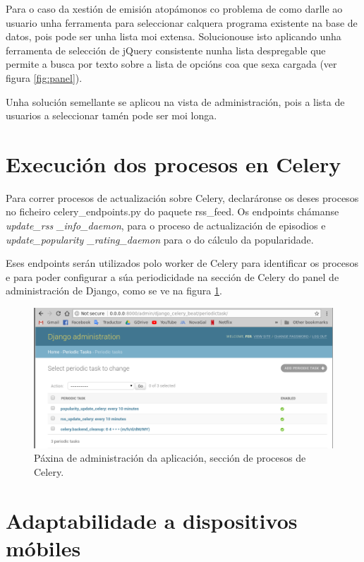 Para o caso da xestión de emisión atopámonos co problema de como darlle ao usuario unha ferramenta para seleccionar calquera programa existente na base de datos, pois pode ser unha lista moi extensa. Solucionouse isto aplicando unha ferramenta de selección de jQuery consistente nunha lista despregable que permite a busca por texto sobre a lista de opcións coa que sexa cargada (ver figura \ref{fig:panel}). 

Unha solución semellante se aplicou na vista de administración, pois a lista de usuarios a seleccionar tamén pode ser moi longa.




\section{Execución dos procesos en Celery}

Para correr procesos de actualización sobre Celery, declaráronse os  deses procesos no ficheiro celery\_endpoints.py do paquete rss\_feed. Os endpoints chámanse \textit{update\_rss \_info\_daemon}, para o proceso de actualización de episodios e \textit{update\_popularity \_rating\_daemon} para o do cálculo da popularidade. 

Eses endpoints serán utilizados polo worker de Celery para identificar os procesos e para poder configurar a súa periodicidade na sección de Celery do panel de administración de Django, como se ve na figura \ref{fig:celery}.

\begin{figure}[H]
	\centering
	\includegraphics[scale=0.43,keepaspectratio=true]{./images/celery.png}
	\caption{Páxina de administración da aplicación, sección de procesos de Celery.}
	\label{fig:celery}
\end{figure} 


\section{Adaptabilidade a dispositivos móbiles}

